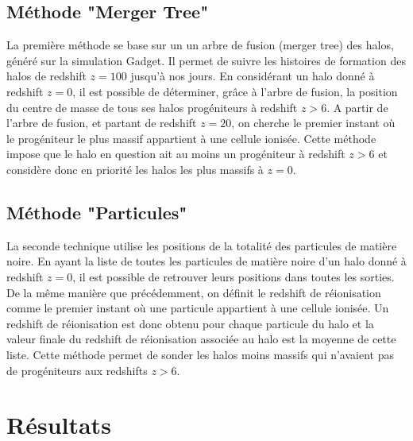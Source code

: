 \subsection{Méthode "Merger Tree"}
La première méthode se base sur un un arbre de fusion (merger tree) des halos, généré sur la simulation Gadget.
Il permet de suivre les histoires de formation des halos de redshift $z=100$ jusqu'à nos jours.
En considérant un halo donné à redshift $z=0$, il est possible de déterminer, grâce à l'arbre de fusion, la position du centre de masse de tous ses halos progéniteurs à redshift $z>6$.
A partir de l'arbre de fusion, et partant de redshift $z=20$, on cherche le premier instant où le progéniteur le plus massif appartient à une cellule ionisée.
Cette méthode impose que le halo en question ait au moins un progéniteur à redshift $z>6$ et considère donc en priorité les halos les plus massifs à $z=0$.

\subsection{Méthode "Particules"}
La seconde technique utilise les positions de la totalité des particules de matière noire.
En ayant la liste de toutes les particules de matière noire d'un halo donné à redshift $z=0$, il est possible de retrouver leurs positions dans toutes les sorties.
De la même manière que précédemment, on définit le redshift de réionisation comme le premier instant où une particule appartient à une cellule ionisée.
Un redshift de réionisation est donc obtenu pour chaque particule du halo et la valeur finale du redshift de réionisation associée au halo est la moyenne de cette liste.
Cette méthode permet de sonder les halos moins massifs qui n'avaient pas de progéniteurs aux redshifts $z>6$.

\section{Résultats}


